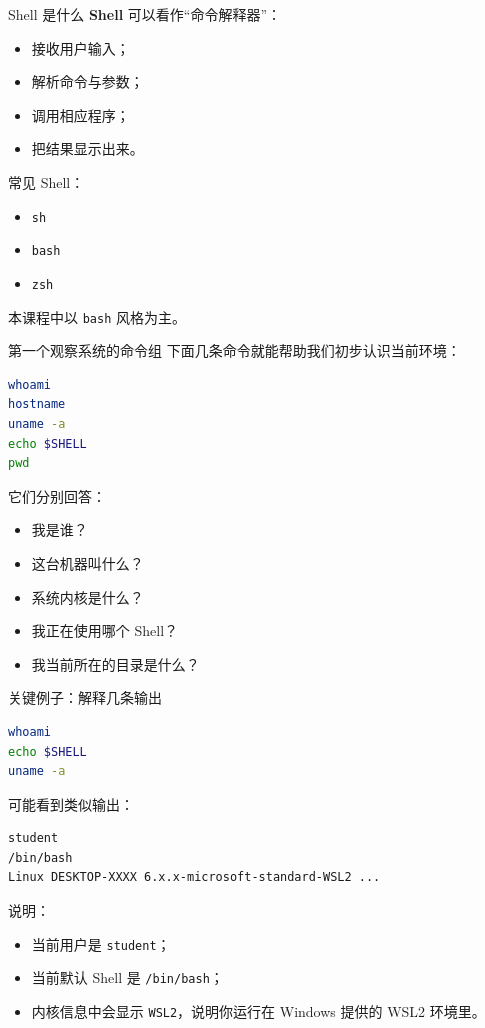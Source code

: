 \documentclass[aspectratio=169]{beamer}
\begin{document}
\begin{frame}{Shell 是什么}
\textbf{Shell} 可以看作“命令解释器”：
\begin{itemize}
  \item 接收用户输入；
  \item 解析命令与参数；
  \item 调用相应程序；
  \item 把结果显示出来。
\end{itemize}

\vspace{0.5em}
常见 Shell：
\begin{itemize}
  \item \texttt{sh}
  \item \texttt{bash}
  \item \texttt{zsh}
\end{itemize}

\vspace{0.5em}
本课程中以 \texttt{bash} 风格为主。
\end{frame}

\begin{frame}[fragile]{第一个观察系统的命令组}
下面几条命令就能帮助我们初步认识当前环境：

\begin{lstlisting}[language=bash]
whoami
hostname
uname -a
echo $SHELL
pwd
\end{lstlisting}

\vspace{0.5em}
它们分别回答：
\begin{itemize}
  \item 我是谁？
  \item 这台机器叫什么？
  \item 系统内核是什么？
  \item 我正在使用哪个 Shell？
  \item 我当前所在的目录是什么？
\end{itemize}
\end{frame}

\begin{frame}[fragile]{关键例子：解释几条输出}
\begin{lstlisting}[language=bash]
whoami
echo $SHELL
uname -a
\end{lstlisting}

可能看到类似输出：
\begin{lstlisting}[language=bash]
student
/bin/bash
Linux DESKTOP-XXXX 6.x.x-microsoft-standard-WSL2 ...
\end{lstlisting}

说明：
\begin{itemize}
  \item 当前用户是 \texttt{student}；
  \item 当前默认 Shell 是 \texttt{/bin/bash}；
  \item 内核信息中会显示 \texttt{WSL2}，说明你运行在 Windows 提供的 WSL2 环境里。
\end{itemize}
\end{frame}
\end{document}
